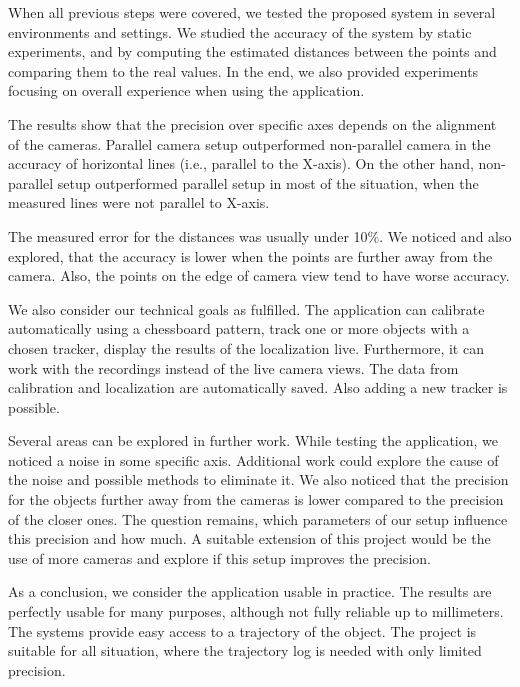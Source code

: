 When all previous steps were covered, we tested the proposed system in several
environments and settings. We studied the accuracy of the system by static
experiments, and by computing the estimated distances between the points and
comparing them to the real values. In the end, we also provided experiments
focusing on overall experience when using the application.

The results show that the precision over specific axes depends on the alignment
of the cameras. Parallel camera setup outperformed non-parallel camera in the
accuracy of horizontal lines (i.e., parallel to the X-axis). On the other hand,
non-parallel setup outperformed parallel setup in most of the situation, when
the measured lines were not parallel to X-axis.

The measured error for the distances was usually under 10\%. We noticed and
also explored, that the accuracy is lower when the points are further away
from the camera. Also, the points on the edge of camera view tend to have worse
accuracy.

\bigskip

We also consider our technical goals as fulfilled. The application can
calibrate automatically using a chessboard pattern, track one or more objects
with a chosen tracker, display the results of the localization live.
Furthermore, it can work with the recordings instead of the live camera views.
The data from calibration and localization are automatically saved. Also
adding a new tracker is possible.

\bigskip

Several areas can be explored in further work. While testing the application,
we noticed a noise in some specific axis. Additional work could explore the
cause of the noise and possible methods to eliminate it. We also noticed that
the precision for the objects further away from the cameras is lower compared to
the precision of the closer ones. The question remains, which parameters of our
setup influence this precision and how much. A suitable extension of this
project would be the use of more cameras and explore if this setup improves the
precision.

\bigskip

As a conclusion, we consider the application usable in practice. The results
are perfectly usable for many purposes, although not fully reliable up to
millimeters. The systems provide easy access to a trajectory of the object.
The project is suitable for all situation, where the trajectory log is needed
with only limited precision.
